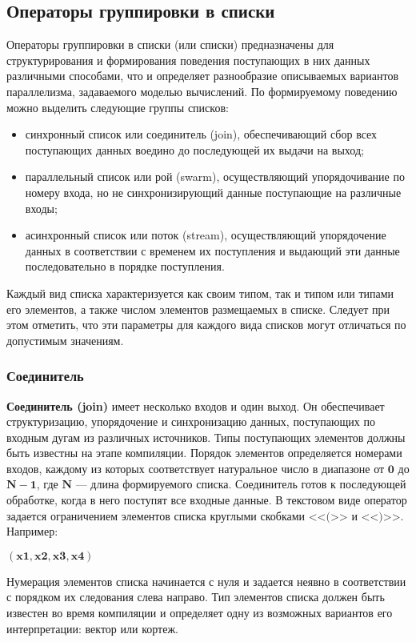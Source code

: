 \subsection{Операторы группировки в списки}

Операторы группировки в списки (или списки) предназначены для структурирования и формирования поведения поступающих в них данных различными способами, что и определяет разнообразие описываемых вариантов параллелизма, задаваемого моделью вычислений. По формируемому поведению можно выделить следующие группы списков:
\begin{itemize}
	\item синхронный список или соединитель (join), обеспечивающий сбор всех поступающих данных воедино до последующей их выдачи на выход;
	\item параллельный список или рой (swarm), осуществляющий упорядочивание по номеру входа, но не синхронизирующий данные поступающие на различные входы;
	\item асинхронный список или поток (stream), осуществляющий упорядочение данных в соответствии с временем их поступления и выдающий эти данные последовательно в порядке поступления.
\end{itemize}
Каждый вид списка характеризуется как своим типом, так и типом или типами его элементов, а также числом элементов размещаемых в списке. Следует при этом отметить, что эти параметры для каждого вида списков могут отличаться по допустимым значениям.

\subsubsection{Соединитель}

\textbf{Соединитель (join)} имеет несколько входов и один выход. Он обеспечивает структуризацию, упорядочение и синхронизацию данных, поступающих по входным дугам из различных источников. Типы поступающих элементов должны быть известны на этапе компиляции. Порядок элементов определяется номерами входов, каждому из которых соответствует натуральное число в диапазоне от $\mathbf{0}$ до $\mathbf{N-1}$, где $\mathbf{N}$ --- длина формируемого списка. Соединитель готов к последующей обработке, когда в него поступят все входные данные. В текстовом виде оператор задается ограничением элементов списка круглыми скобками <<$\mathbf{(}$>> и <<$\mathbf{)}$>>. Например:

\begin{center}
	$\mathbf{(x1, x2, x3, x4)}$
\end{center}
Нумерация элементов списка начинается с нуля и задается неявно в соответствии с порядком их следования слева направо. Тип элементов списка должен быть известен во время компиляции и определяет одну из возможных вариантов его интерпретации: вектор или кортеж.

